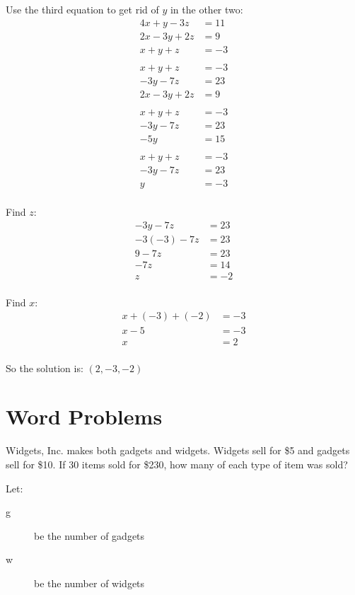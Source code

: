\documentclass[fleqn,addpoints]{exam}
\begin{document}
\begin{questions}
\begin{solution}[8 cm]
Use the third equation to get rid of $y$ in the other two:
\begin{align*}
  4x + y -3z &= 11 \\
  2x - 3y + 2z &= 9 \\
  x + y + z &= -3 \\  
  \\
  x + y + z &= -3 \\  
  -3y - 7z &= 23 \\
  2x - 3y + 2z &= 9 \\  
  \\
  x + y + z &= -3 \\  
  -3y - 7z &= 23 \\
  -5y      &= 15 \\
  \\
  x + y + z &= -3 \\  
  -3y - 7z &= 23 \\
  y      &= -3 \\
\end{align*}

Find $z$: 
\begin{align*}
  -3y - 7z &= 23 \\
  -3(-3) - 7z &= 23 \\
  9 - 7z &= 23 \\
  -7z &= 14 \\
  z &= -2 \\
\end{align*}

Find $x$:
\begin{align*}
  x + (-3) + (-2) &= -3 \\  
  x - 5 &= -3 \\  
  x  &= 2 \\  
\end{align*}

So the solution is: $(2, -3, -2)$
\end{solution}

\ifprintanswers
\pagebreak
\fi

\section{Word Problems}
\question[10] 
Widgets, Inc. makes both gadgets and widgets.  Widgets sell for \$5 and gadgets sell for \$10.  If 30 items sold for
\$230, how many of each type of item was sold?

\begin{solution}[8 cm]
Let:
\begin{description}
  \item[g] be the number of gadgets
  \item[w] be the number of widgets
\end{description}


\end{solution}
\end{questions}
\end{document}
